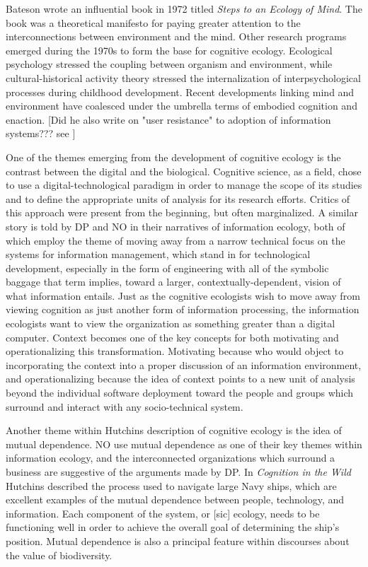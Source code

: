 Bateson wrote an influential book in 1972 titled \textit{Steps to an Ecology of Mind}. The book was a theoretical manifesto for paying greater attention to the interconnections between environment and the mind. Other research programs emerged during the 1970s to form the base for cognitive ecology. Ecological psychology stressed the coupling between organism and environment, while cultural-historical activity theory stressed the internalization of interpsychological processes during childhood development. Recent developments linking mind and environment have coalesced under the umbrella terms of embodied cognition and enaction. [Did he also write on "user resistance" to adoption of information systems??? see \citep{star_1996}]

One of the themes emerging from the development of cognitive ecology is the contrast between the digital and the biological. Cognitive science, as a field, chose to use a digital-technological paradigm in order to manage the scope of its studies and to define the appropriate units of analysis for its research efforts. Critics of this approach were present from the beginning, but often marginalized. A similar story is told by DP and NO in their narratives of information ecology, both of which employ the theme of moving away from a narrow technical focus on the systems for information management, which stand in for technological development, especially in the form of engineering with all of the symbolic baggage that term implies, toward a larger, contextually-dependent, vision of what information entails. Just as the cognitive ecologists wish to move away from viewing cognition as just another form of information processing, the information ecologists want to view the organization as something greater than a digital computer. Context becomes one of the key concepts for both motivating and operationalizing this transformation. Motivating because who would object to incorporating the context into a proper discussion of an information environment, and operationalizing because the idea of context points to a new unit of analysis beyond the individual software deployment toward the people and groups which surround and interact with any socio-technical system.

Another theme within Hutchins description of cognitive ecology is the idea of mutual dependence. NO use mutual dependence as one of their key themes within information ecology, and the interconnected organizations which surround a business are suggestive of the arguments made by DP. In \textit{Cognition in the Wild} Hutchins described the process used to navigate large Navy ships, which are excellent examples of the mutual dependence between people, technology, and information. Each component of the system, or [sic] ecology, needs to be functioning well in order to achieve the overall goal of determining the ship's position. Mutual dependence is also a principal feature within discourses about the value of biodiversity.

